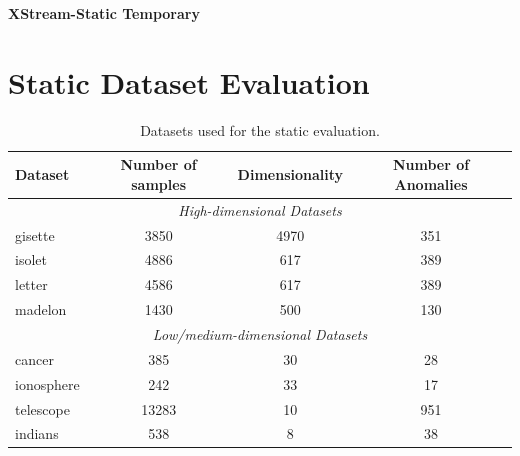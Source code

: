 \documentclass[11pt,onecolumn]{article}
\begin{document}
\textbf{\huge{XStream-Static Temporary}}

\section{Static Dataset Evaluation}

\begin{table}[h!]
	\centering
	\begin{tabular}{lccc}
	\toprule
	\textbf{Dataset} & \textbf{Number of samples} & \textbf{Dimensionality} & \textbf{Number of Anomalies}\\
	\midrule
	\multicolumn{4}{c}{\textit{High-dimensional Datasets}}\\
	gisette 		& 3850 & 4970 & 351	\\
	isolet 			& 4886 & 617 & 389	\\
	letter			& 4586 & 617 & 389	\\
	madelon 		& 1430 & 500 & 130	\\
	\midrule
	\multicolumn{4}{c}{\textit{Low/medium-dimensional Datasets}}\\
	cancer 			& 385      & 30  & 28	\\
	ionosphere  & 242      & 33  & 17		\\
	telescope   & 13283    & 10  & 	951		\\
	indians    	& 538      & 8	& 38		\\
	\bottomrule
	\end{tabular}
	\caption{Datasets used for the static evaluation.}
	\label{table:datasets}
\end{table}
\end{document}
